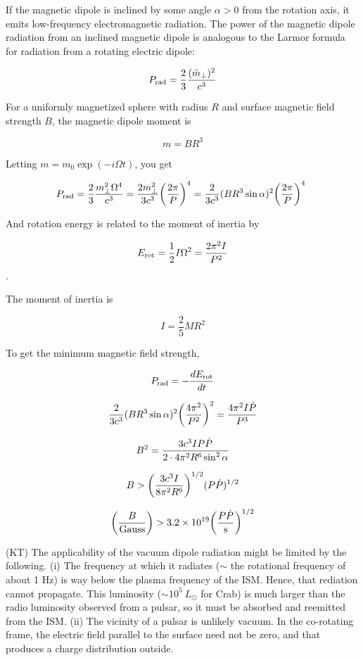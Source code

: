 \documentclass[a4paper]{article}
\begin{document}
\begin{enumerate}
If the magnetic dipole is inclined by some angle $\alpha > 0$ from the rotation axis, it emits low-frequency electromagnetic radiation. The power of the magnetic dipole radiation from an inclined magnetic dipole is analogous to the Larmor formula for radiation from a rotating electric dipole:

$$ {P_{\rm rad} = {2 \over 3} { (
\ddot{m}_\bot )^2 \over c^3}}\rlap{\quad \rm } $$

For a uniformly magnetized sphere with radius $R$ and surface magnetic field strength $B$, the magnetic dipole moment is

$$ m = B R^3 $$

Letting $m =m_0 \exp ( - i \Omega t)$, you get

$$ P_{\rm rad} = {2 \over 3} { m_\bot^2 \Omega^4 \over c^3} = {2
m_\bot^2 \over 3 c^3} \biggl( {2 \pi \over P} \biggr)^4 = {2 \over 3
c^3} ( B R^3 \sin \alpha)^2 \biggl( {2 \pi \over P} \biggr)^4~ $$

And rotation energy is related to the moment of inertia by

$$ E_{\rm rot} = \frac{1}{2}I \Omega^2 = {2 \pi^2 I
\over P^2} $$. 

The moment of inertia is

$$ I = \frac{2}{5} M R^2 $$

To get the minimum magnetic field strength,

$$ P_{\rm rad} = - {d E_{\rm rot} \over d t} $$

$$ {2 \over 3 c^3} (B R^3 \sin \alpha)^2 \biggl( { 4 \pi^2 \over P^2}
\biggr)^2 = {4 \pi^2 I \dot{P} \over P^3} $$

$$ B^2 = { 3 c^3 I P \dot{P} \over 2 \cdot 4 \pi^2 R^6 \sin^2\alpha } $$

$$ B > \biggl( { 3 c^3 I \over 8 \pi^2 R^6} \biggr)^{1/2} (P \dot{P})^{1/2} $$

$$ \biggl( { B \over {\rm Gauss}}
\biggr) > 3.2 \times 10^{19} \biggl( 
{ P \dot{P} \over {\rm s} } 
\biggr)^{1/2} $$

(KT) The applicability of the vacuum dipole radiation might be limited by the following. 
(i) The frequency at which it radiates ($\sim$ the rotational frequency of about 1 Hz) is way below the plasma frequency of the ISM. Hence, that rediation cannot propagate. This luminosity ($\sim 10^5 \ L_{\odot}$ for Crab) is much larger than the radio luminosity observed from a pulsar, so it must be absorbed and reemitted from the ISM. 
(ii) The vicinity of a pulsar is unlikely vacuum. In the co-rotating frame, the electric field parallel to the surface need not be zero, and that produces a charge distribution outside. 


\end{enumerate}
\end{document}
